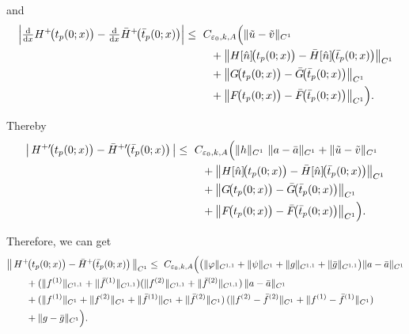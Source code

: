 \documentclass[a4paper,reqno,11pt]{amsart}
\numberwithin{equation}{section} %
\begin{document}
and
\[
\begin{aligned}
\Bigl|\tfrac{\mathrm d}{\mathrm dx}H^+\!\bigl(t_p(0;x)\bigr)
 - \tfrac{\mathrm d}{\mathrm dx}\bar H^+\!\bigl(\bar t_p(0;x)\bigr)\Bigr|
\le{}&\ C_{\varepsilon_0,k,A}\Bigl(
  \|\tilde u-\tilde v\|_{C^{1}} \\
&\quad + \bigl\| H[\hat n]\!\bigl(t_p(0;x)\bigr)
          - \bar H[\hat n]\!\bigl(\bar t_p(0;x)\bigr) \bigr\|_{C^{1}} \\
&\quad + \bigl\| G\!\bigl(t_p(0;x)\bigr)
          - \bar G\!\bigl(\bar t_p(0;x)\bigr) \bigr\|_{C^{1}} \\
&\quad + \bigl\| F\!\bigl(t_p(0;x)\bigr)
          - \bar F\!\bigl(\bar t_p(0;x)\bigr) \bigr\|_{C^{1}}
\Bigr).
\end{aligned}
\]

Thereby
\[
\begin{aligned}
\bigl|\,H^{+ \prime}\!\bigl(t_p(0;x)\bigr)-\bar H^{+ \prime}\!\bigl(\bar t_p(0;x)\bigr)\,\bigr|
\le{}&\ C_{\varepsilon_0,k,A}\Bigl(
  \|h\|_{C^{1}}\ \|a-\bar a\|_{C^{1}}
  + \|\tilde u-\tilde v\|_{C^{1}} \\
&\quad + \bigl\| H[\hat n]\!\bigl(t_p(0;x)\bigr)-\bar H[\hat n]\!\bigl(\bar t_p(0;x)\bigr) \bigr\|_{C^{1}} \\
&\quad + \bigl\| G\!\bigl(t_p(0;x)\bigr)-\bar G\!\bigl(\bar t_p(0;x)\bigr) \bigr\|_{C^{1}} \\
&\quad + \bigl\| F\!\bigl(t_p(0;x)\bigr)-\bar F\!\bigl(\bar t_p(0;x)\bigr) \bigr\|_{C^{1}}
\Bigr).
\end{aligned}
\]

Therefore, we can get
\[
\begin{aligned}
&\bigl\|\,H^+\!\bigl(t_p(0;x)\bigr)-\bar H^+\!\bigl(\bar t_p(0;x)\bigr)\,\bigr\|_{C^{1}}
\le{}\ C_{\varepsilon_0,k,A}\Bigl(
	\bigl(\|\varphi\|_{C^{1,1}}+\|\psi\|_{C^{1}}
     + \|g\|_{C^{1,1}}+\|\bar g\|_{C^{1,1}}\bigr)\|a-\bar a\|_{C^{1}}
 \\
&\qquad
     + (\|f^{(1)}\|_{C^{1,1}}+\|\bar f^{(1)}\|_{C^{1,1}})
       (\|f^{(2)}\|_{C^{1,1}}+\|\bar f^{(2)}\|_{C^{1,1}})\,
    \|a-\bar a\|_{C^{1}} \\
&\qquad
	 + (\|f^{(1)}\|_{C^{1}}+\|f^{(2)}\|_{C^{1}}
   +\|\bar f^{(1)}\|_{C^{1}}+\|\bar f^{(2)}\|_{C^{1}})\,
  (\|f^{(2)}-\bar f^{(2)}\|_{C^{1}}
   +\|f^{(1)}-\bar f^{(1)}\|_{C^{1}})\\
&\qquad
  + \|g-\bar g\|_{C^{1}}
\Bigr).
\end{aligned}
\]
\end{document}
